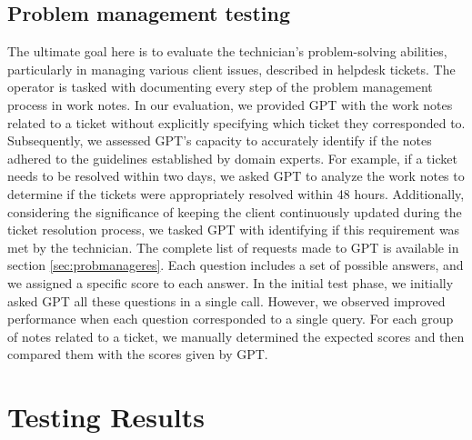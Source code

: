 \subsection{Problem management testing}
The ultimate goal here is to evaluate the technician's problem-solving abilities, particularly in managing various client issues, described in helpdesk tickets. The operator is tasked with documenting every step of the problem management process in work notes. In our evaluation, we provided GPT with the work notes related to a ticket without explicitly specifying which ticket they corresponded to. Subsequently, we assessed GPT's capacity to accurately identify if the notes adhered to the guidelines established by domain experts. For example, if a ticket needs to be resolved within two days, we asked GPT to analyze the work notes to determine if the tickets were appropriately resolved within 48 hours. Additionally, considering the significance of keeping the client continuously updated during the ticket resolution process, we tasked GPT with identifying if this requirement was met by the technician. The complete list of requests made to GPT is available in section \ref{sec:probmanageres}. Each question includes a set of possible answers, and we assigned a specific score to each answer. In the initial test phase, we initially asked GPT all these questions in a single call. However, we observed improved performance when each question corresponded to a single query. For each group of notes related to a ticket, we manually determined the expected scores and then compared them with the scores given by GPT.

\section{Testing Results}
\label{sec:testingresults}

